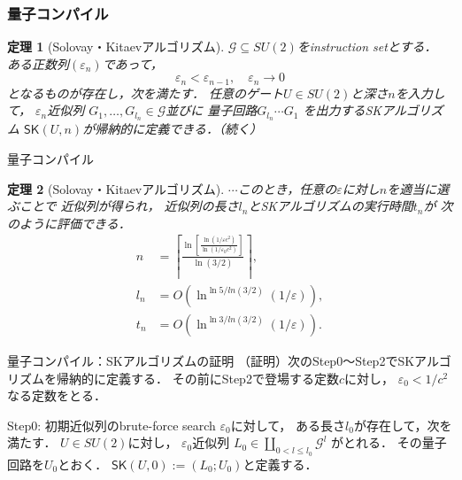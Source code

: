 \documentclass{beamer} %
\renewcommand{\epsilon}{\varepsilon}
\renewcommand{\subset}{\subseteq}
\newtheorem{thm}{定理}
\newcommand{\0}{\mathbf{0}}
\newcommand{\1}{\mathbf{1}}
\newcommand{\2}{\mathbf{2}}
\newcommand{\SK}{\mathsf{SK}}
\begin{document}

\begin{frame}
  \frametitle{量子コンパイル}
  \begin{thm}[Solovay・Kitaevアルゴリズム]
    \label{SK algrithm}
    \(\mathcal{G}\subset SU(2)\)をinstruction setとする．
    ある正数列\((\epsilon_n)\)であって，
    \[
      \epsilon_n < \epsilon_{n-1},\quad \epsilon_n\to 0
    \]
    となるものが存在し，次を満たす．
    任意のゲート\(U\in SU(2)\)と深さ\(n\)を入力して，
    \(\epsilon_n\)近似列
    \(G_1,\ldots,G_{l_n}\in \mathcal{G}\)並びに
    量子回路\(G_{l_n}\cdots G_1\)
    を出力するSKアルゴリズム
    \(\SK(U,n)\)が帰納的に定義できる．（続く）
  \end{thm}
\end{frame}

\begin{frame}{量子コンパイル}
  \begin{thm}[Solovay・Kitaevアルゴリズム]
    \(\cdots\)このとき，任意の\(\epsilon\)に対し\(n\)を適当に選ぶことで
    近似列が得られ，
    近似列の長さ\(l_n\)とSKアルゴリズムの実行時間\(t_n\)が
    次のように評価できる．
    \begin{align*}
      n   & = \left\lceil\frac{\ln[\frac{\ln(1/\epsilon c^2)}{\ln(1/\epsilon_0 c^2)}]}{\ln(3/2)}\right\rceil, \\
      l_n & = O(\ln^{\ln 5/ln(3/2)}(1/\epsilon)),                                                             \\
      t_n & = O(\ln^{\ln 3/ln(3/2)}(1/\epsilon)).
    \end{align*}
  \end{thm}
\end{frame}

\begin{frame}{量子コンパイル：SKアルゴリズムの証明}
  （証明）次のStep0〜Step2でSKアルゴリズムを帰納的に定義する．
  その前にStep2で登場する定数\(c\)に対し，
  \(\epsilon_0 < 1/c^2\)なる定数をとる．
  \begin{exampleblock}
    {Step0: 初期近似列のbrute-force search}
    \(\epsilon_0\)に対して，
    ある長さ\(l_0\)が存在して，次を満たす．
    \(U\in SU(2)\)に対し，
    \(\epsilon_0\)近似列
    \(L_0 \in \coprod_{0 < l \leq l_0}\mathcal{G}^l\)
    がとれる．
    その量子回路を\(U_0\)とおく．
    \(\SK(U,0) := (L_0;U_0)\)と定義する．
  \end{exampleblock}
\end{frame}
\end{document}
